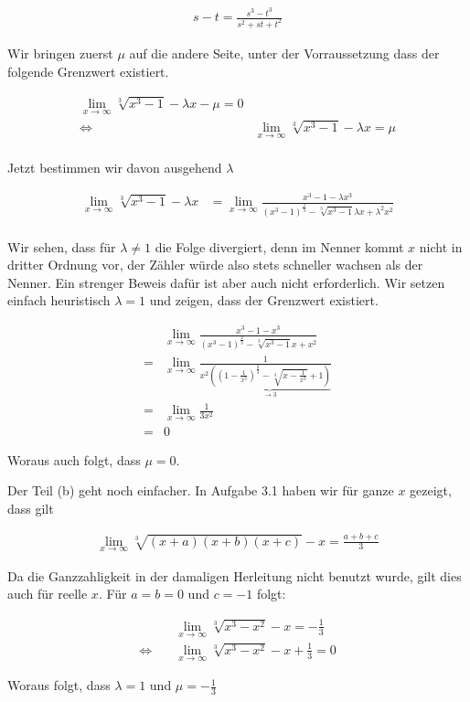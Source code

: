 \documentclass[a4paper,german,12pt,smallheadings]{scrartcl}
\begin{document}
\begin{align*}
  s - t = \frac{s^3 - t^3}{s^2 + st + t^2}
\end{align*}

Wir bringen zuerst $\mu$ auf die andere Seite, unter der Vorraussetzung dass
der folgende Grenzwert existiert.

\begin{align*}
  \lim_{x \to \infty} \sqrt[3]{x^3 - 1} - \lambda x - \mu = 0\\
  \Leftrightarrow\quad&\lim_{x \to \infty} \sqrt[3]{x^3 - 1} - \lambda x = \mu \\
\end{align*}

Jetzt bestimmen wir davon ausgehend $\lambda$

\begin{align*}
  \lim_{x \to \infty} \sqrt[3]{x^3 - 1} - \lambda x &= \lim_{x \to \infty} \frac{x^3 - 1 - \lambda x^3}{(x^3 - 1)^\frac{2}{3} - \sqrt[3]{x^3 - 1}\lambda x + \lambda^2 x^2} \\
\end{align*}

Wir sehen, dass für $\lambda \neq 1$ die Folge divergiert, denn im Nenner kommt
$x$ nicht in dritter Ordnung vor, der Zähler würde also stets schneller wachsen
als der Nenner. Ein strenger Beweis dafür ist aber auch nicht erforderlich. Wir
setzen einfach heuristisch $\lambda = 1$ und zeigen, dass der Grenzwert
existiert.

\begin{align*}
  &\lim_{x \to \infty} \frac{x^3 - 1 - x^3}{(x^3 - 1)^\frac{2}{3} - \sqrt[3]{x^3 - 1}x + x^2} \\
  =&\lim_{x \to \infty} \frac{1}{x^2 \underbrace{((1 - \frac{1}{x^3})^\frac{2}{3} - \sqrt[3]{x - \frac{1}{x^3}} + 1)}_{\to 3}} \\
  =&\lim_{x \to \infty} \frac{1}{3x^2} \\
  =& 0
\end{align*}

Woraus auch folgt, dass $\mu = 0$.

Der Teil (b) geht noch einfacher. In Aufgabe 3.1 haben wir für ganze $x$
gezeigt, dass gilt

\begin{align*}
  \lim_{x \to \infty} \sqrt[3]{(x+a)(x+b)(x+c)} - x = \frac{a+b+c}{3}
\end{align*}

Da die Ganzzahligkeit in der damaligen Herleitung nicht benutzt wurde, gilt
dies auch für reelle $x$. Für $a = b = 0$ und $c = -1$ folgt:

\begin{align*}
  &\lim_{x \to \infty} \sqrt[3]{x^3 - x^2} - x = -\frac{1}{3} \\
  \Leftrightarrow\quad &\lim_{x \to \infty} \sqrt[3]{x^3 - x^2} - x + \frac{1}{3} = 0
\end{align*}

Woraus folgt, dass $\lambda = 1$ und $\mu = -\frac{1}{3}$
\end{document}
